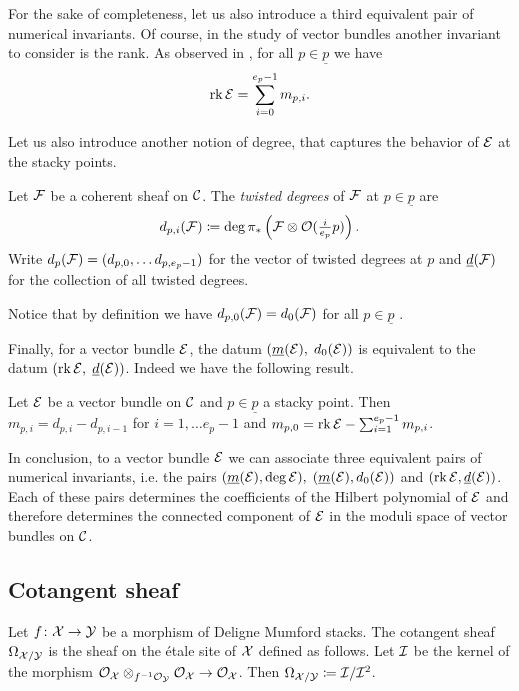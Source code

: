 For the sake of completeness, let us also introduce a third equivalent pair of numerical invariants. Of course, in the study of vector bundles another invariant to consider is the rank. As observed in , for all $p \in \underline{p}$ we have
\begin{equation}
\operatorname{rk} \mathcal{E} = \sum_{i=0}^{e_p-1} m_{p,i}.
\end{equation}

Let us also introduce another notion of degree, that captures the behavior of $\mathcal{E}$ at the stacky points.

\begin{defi}\cite[Definition 1.2.7]{Taams} \label{def: twisted degrees}
Let $\mathcal{F}$ be a coherent sheaf on $\mathcal{C}$. The \textit{twisted degrees} of $\mathcal{F}$ at $p \in \underline{p}$ are
\[
d_{p, i}(\mathcal{F}) \coloneqq \deg \pi_* \left( \mathcal{F} \otimes \mathcal{O}(\tfrac{i}{e_p}p) \right).
\]
Write $d_p(\mathcal{F}) = (d_{p, 0}, \dots d_{p, e_p-1})$ for the vector of twisted degrees at $p$ and $\underline{d}(\mathcal{F})$ for the collection of all twisted degrees.
\end{defi}

Notice that by definition we have $d_{p,0}(\mathcal{F}) = d_0(\mathcal{F})$ for all $p \in \underline{p}$ .

Finally, for a vector bundle $\mathcal{E}$, the datum $(\underline{m}(\mathcal{E}), \;  d_0(\mathcal{E}))$ is equivalent to the datum $(\operatorname{rk} \mathcal{E}, \; \underline{d}(\mathcal{E}))$. Indeed we have the following result.

\begin{prop}\cite[Corollary 1.2.21]{Taams} \label{discrete data}
Let $\mathcal{E}$ be a vector bundle on $\mathcal{C}$ and $p \in \underline{p}$ a stacky point. Then $m_{p,i} = d_{p, i} - d_{p, i-1}$ for $i = 1, \dots e_p-1$ and $m_{p,0} = \operatorname{rk} \mathcal{E} - \sum_{i=1}^{e_p-1} m_{p, i}$.
\end{prop}

In conclusion, to a vector bundle $\mathcal{E}$ we can associate three equivalent pairs of numerical invariants, i.e. the pairs  $(\underline{m}(\mathcal{E}), \deg \mathcal{E}), \; (\underline{m}(\mathcal{E}), d_0(\mathcal{E}))$ and $(\operatorname{rk} \mathcal{E}, \underline{d}(\mathcal{E}))$. Each of these pairs determines the coefficients of the Hilbert polynomial of $\mathcal{E}$ and therefore determines the connected component of $\mathcal{E}$ in the moduli space of vector bundles on $\mathcal{C}$.

\subsection{Cotangent sheaf}
\begin{defi}
Let $f \colon \mathcal{X} \to \mathcal{Y}$ be a morphism of Deligne Mumford stacks. The cotangent sheaf $\Omega_{\mathcal{X} / \mathcal{Y}}$ is the sheaf on the étale site of $\mathcal{X}$ defined as follows.
Let $\mathcal{I}$ be the kernel of the morphism $\mathcal{O}_{\mathcal{X}} \otimes_{f^{-1}\mathcal{O}_{\mathcal{Y}}} \mathcal{O}_{\mathcal{X}} \to \mathcal{O}_{\mathcal{X}}$. Then $\Omega_{\mathcal{X} / \mathcal{Y}} \coloneqq \mathcal{I} / \mathcal{I}^2$.
\end{defi}

